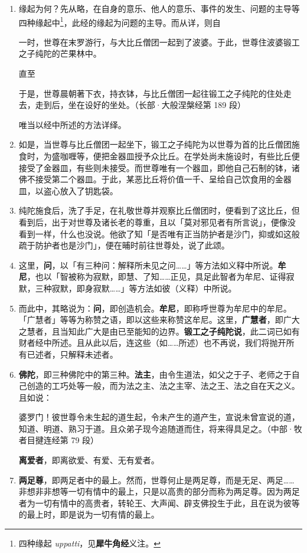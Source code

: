 \begin{enumerate}\item 缘起为何？先从略，在自身的意乐、他人的意乐、事件的发生、问题的主导等四种缘起中\footnote{四种缘起 \textit{uppatti}，见\textbf{犀牛角经}义注。}，此经的缘起为问题的主导。而从详，则自\begin{quoting}一时，世尊在末罗游行，与大比丘僧团一起到了波婆。于此，世尊住波婆锻工之子纯陀的芒果林中。\end{quoting}直至\begin{quoting}于是，世尊晨朝著下衣，持衣钵，与比丘僧团一起往锻工之子纯陀的住处走去，走到后，坐在设好的坐处。（长部·大般涅槃经第 189 段）\end{quoting}唯当以经中所述的方法详绎。
\item 如是，当世尊与比丘僧团一起坐下，锻工之子纯陀为以世尊为首的比丘僧团施食时，为盛咖喱等，便把金器皿授予众比丘。在学处尚未施设时，有些比丘便接受了金器皿，有些则未接受。而世尊唯有一个器皿，即他自己石制的钵，诸佛不接受第二个器皿。于此，某恶比丘将价值一千、呈给自己饮食用的金器皿，以盗心放入了钥匙袋。
\item 纯陀施食后，洗了手足，在礼敬世尊并观察比丘僧团时，便看到了这比丘，但看到后，出于对世尊及诸长老的尊重，且以「莫对邪见者有所言说」，便像没看到一样，什么也没说。他欲了知「是否唯有正当防护者是沙门，抑或如这般疏于防护者也是沙门」，便在晡时前往世尊处，说了此颂。
\item 这里，\textbf{问}，以「有三种问：解释所未见之问……」等方法如义释中所说。\textbf{牟尼}，也以「智被称为寂默，即慧、了知……正见，具足此智者为牟尼、证得寂默，三种寂默，即身寂默……」等方法如彼（义释）中所说。
\item 而此中，其略说为：\textbf{问}，即创造机会。\textbf{牟尼}，即称呼世尊为牟尼中的牟尼。「广慧者」等等为称赞之语，即以这些来称赞这牟尼。这里，\textbf{广慧者}，即广大之慧者，且当知此广大是由已至能知的边界。\textbf{锻工之子纯陀说}，此二词已如有财者经中所述。且从此以后，连这些（如……所述）也不再说，我们将抛开所有已述者，只解释未述者。
\item \textbf{佛陀}，即三种佛陀中的第三种。\textbf{法主}，由令生道法，如父之于子、老师之于自己创造的工巧处等一般，而为法之主、法之主宰、法之王、法之自在天之义。且如说：\begin{quoting}婆罗门！彼世尊令未生起的道生起，令未产生的道产生，宣说未曾宣说的道，知道、明道、熟习于道。且众弟子现今追随道而住，将来得具足之。（中部·牧者目揵连经第 79 段）\end{quoting}\textbf{离爱者}，即离欲爱、有爱、无有爱者。
\item \textbf{两足尊}，即两足者中的最上。然而，世尊何止是两足尊，而是无足、两足……非想非非想等一切有情中的最上，只是以高贵的部分而称为两足尊。因为两足者为一切有情中的高贵者，转轮王、大声闻、辟支佛投生于此，且在说为彼等的最上时，即是说为一切有情的最上。

\end{enumerate}
